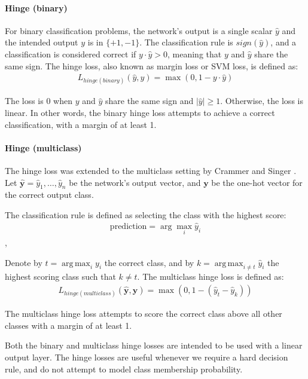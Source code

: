 \documentclass[jair,twoside,11pt,theapa]{article}
\newcommand{\m}[1]{\mathbf{#1}}%
\renewcommand{\shortcite}[0]{\citeyear}
\DeclareMathOperator*{\argmax}{arg\,max}
\begin{document}
{\paragraph{Hinge (binary)} 
For binary classification problems, the network's output is a single scalar
$\hat{y}$ and the intended output $y$ is in $\{+1,-1\}$.  The classification rule
is $sign(\hat{y})$, and a classification is
considered correct if $y\cdot\hat{y} > 0$, meaning that $y$ and $\hat{y}$ share
the same sign. 
The hinge loss, also known as margin loss or SVM loss, is defined as:
\begin{align*}
    L_{hinge(binary)}(\hat{y},y) = \max(0, 1 - y\cdot\hat{y})
\end{align*}

The loss is 0 when $y$ and $\hat{y}$ share the same sign and $|\hat{y}| \geq 1$.
Otherwise, the loss is linear.  In other words, the binary hinge loss attempts to achieve a
correct classification, with a margin of at least 1.

\paragraph{Hinge (multiclass)} 
The hinge loss was extended to the multiclass setting by Crammer and Singer
\shortcite{crammer2002algorithmic}.
Let $\m{\hat{y}} = \hat{y}_1,\ldots,\hat{y}_n$ be the network's output vector, and
$\m{y}$ be the one-hot vector for the correct output class.

The classification rule is defined as
selecting the class with the highest score:
\begin{align*}
    \text{prediction} = \arg\max_i \hat{y}_i
\end{align*},

Denote by $t = \argmax_i y_i$ the correct
class, and by $k = \argmax_{i \neq t} \hat{y}_i$ the highest scoring class such that $k\neq t$. 
The multiclass hinge loss is defined as:
\begin{align*}
    L_{hinge(multiclass)}(\m{\hat{y}},\m{y}) = \max(0, 1 - (\hat{y}_t -
    \hat{y}_k))
\end{align*}

\noindent The multiclass hinge loss attempts to score the correct class above
all other classes with a margin of at least 1.

Both the binary and multiclass hinge losses are intended to be used with a
linear output layer.  The hinge losses are useful whenever we require a hard
decision rule, and do not attempt to model class membership probability.

}
\end{document}
